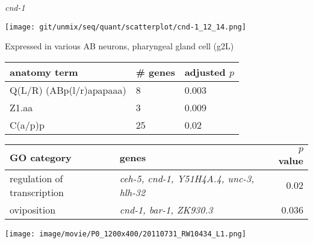 \documentclass[serif,9pt]{beamer}
\begin{document}
\begin{frame}{{\em cnd-1}}
\begin{minipage}{0.4\textwidth}
\texttt{[image: git/unmix/seq/quant/scatterplot/cnd-1\_12\_14.png]}
\end{minipage}
\begin{minipage}{0.58\textwidth}

{\small Expressed in various AB neurons, pharyngeal gland cell (g2L)}

\begin{table}[!tbp]\scriptsize
\begin{tabular}{lll}
anatomy term & \# genes & adjusted $p$ \\
\hline
Q(L/R) {\tiny (ABp(l/r)apapaaa)} & 8 & 0.003 \\
Z1.aa & 3 & 0.009 \\
C(a/p)p & 25 & 0.02 \\
\end{tabular}
\end{table}
\end{minipage}

\begin{table}\footnotesize
\begin{tabular}{llr}
GO category & genes & $p$ value \\
\hline
regulation of transcription & {\em ceh-5, cnd-1, Y51H4A.4, unc-3, hlh-32} & 0.02 \\
oviposition & {\em cnd-1, bar-1, ZK930.3} & 0.036 \\
\end{tabular}
\end{table}

\texttt{[image: image/movie/P0\_1200x400/20110731\_RW10434\_L1.png]}

\end{frame}
\end{document}
